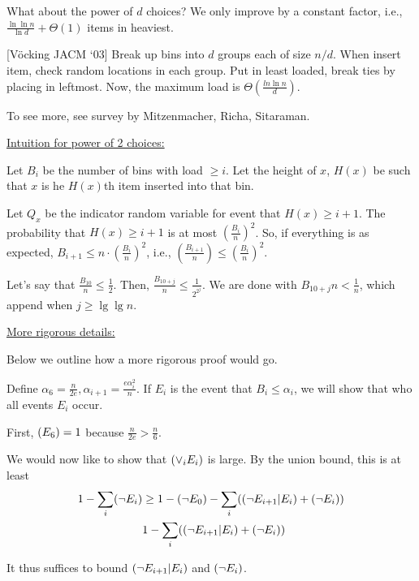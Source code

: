 \documentclass[11pt]{article}
\let\Pr\relax
\DeclareMathOperator*{\Pr}{\mathbb{P}}
\begin{document}
What about the power of $d$ choices? We only improve by a constant factor, i.e., $\frac{\ln\ln n}{\ln d} + \Theta(1)$
items in heaviest.

[V\"{o}cking JACM `03] Break up bins into $d$ groups each of size $n/d$. When insert item, check random
locations in each group. Put in least loaded, break ties by placing in leftmost. Now, the maximum load is
$\Theta\left(\frac{ln\ln n}{d}\right)$.

To see more, see survey by Mitzenmacher, Richa, Sitaraman.

\underline{Intuition for power of 2 choices:}

Let $B_i$ be the number of bins with load $\geq i$. Let the height of $x$, $H(x)$ be such that $x$ is he
$H(x)$th item inserted into that bin.

Let $Q_x$ be the indicator random variable for event that $H(x) \geq i + 1$. The probability that
$H(x) \geq i + 1$ is at most $\left(\frac{B_i}{n}\right)^2$. So, if everything is as expected,
$B_{i+1} \leq n \cdot \left(\frac{B_i}{n}\right)^2$, i.e., $\left(\frac{B_{i+1}}{n}\right) \leq \left(\frac{B_i}{n}\right)^2$.

Let's say that $\frac{B_{10}}{n} \leq \frac{1}{2}$. Then, $\frac{B_{10 + j}}{n} \leq \frac{1}{2^{2^j}}$. We
are done with $B_{10 + j}{n} < \frac{1}{n}$, which append when $j \geq \lg \lg n$.

\underline{More rigorous details:}

Below we outline how a more rigorous proof would go.

Define $\alpha_6 = \frac{n}{2e}, \alpha_{i+1} = \frac{e \alpha_i^2}{n}$. If $E_i$ is the event that $B_i \leq \alpha_i$,
we will show that who all events $E_i$ occur.

First, $\Pr(E_6) = 1$ because $\frac{n}{2e} > \frac{n}{6}$.

We would now like to show that $\Pr(\vee_i E_i)$ is large. By the union bound, this is at least 
\begin{align}
\nonumber 1 - \sum_i \Pr(\neg E_i) &\ge 1 - \Pr(\neg E_0) - \sum_i (\Pr(\neg E_{i+1}|E_i) + \Pr(\neg E_i))\\
{}& 1 -  \sum_i (\Pr(\neg E_{i+1}|E_i) + \Pr(\neg E_i)) \label{eqn:union}
\end{align}

It thus suffices to bound $\Pr(\neg E_{i+1} | E_i)$ and $\Pr(\neg E_i)$.
\end{document}
